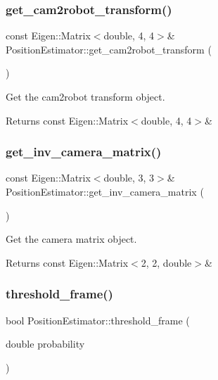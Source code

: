 \subsubsection{\texorpdfstring{get\+\_\+cam2robot\+\_\+transform()}{get\_cam2robot\_transform()}}
{\footnotesize\ttfamily const Eigen\+::\+Matrix$<$double, 4, 4$>$\& Position\+Estimator\+::get\+\_\+cam2robot\+\_\+transform (\begin{DoxyParamCaption}{ }\end{DoxyParamCaption})\hspace{0.3cm}{\ttfamily [inline]}}



Get the cam2robot transform object. 

\begin{DoxyReturn}{Returns}
const Eigen\+::\+Matrix$<$double, 4, 4$>$\& 
\end{DoxyReturn}
\mbox{\label{class_position_estimator_a6832a1905352d24cbc834f2f205ba09b}} 
\subsubsection{\texorpdfstring{get\+\_\+inv\+\_\+camera\+\_\+matrix()}{get\_inv\_camera\_matrix()}}
{\footnotesize\ttfamily const Eigen\+::\+Matrix$<$double, 3, 3$>$\& Position\+Estimator\+::get\+\_\+inv\+\_\+camera\+\_\+matrix (\begin{DoxyParamCaption}{ }\end{DoxyParamCaption})\hspace{0.3cm}{\ttfamily [inline]}}



Get the camera matrix object. 

\begin{DoxyReturn}{Returns}
const Eigen\+::\+Matrix$<$2, 2, double$>$\& 
\end{DoxyReturn}
\mbox{\label{class_position_estimator_a6414758ee472d223f6b97369abe27968}} 
\subsubsection{\texorpdfstring{threshold\+\_\+frame()}{threshold\_frame()}}
{\footnotesize\ttfamily bool Position\+Estimator\+::threshold\+\_\+frame (\begin{DoxyParamCaption}\item[{double}]{probability }\end{DoxyParamCaption})}



